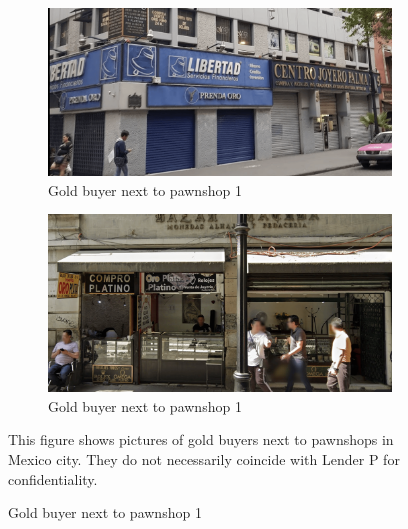 \vspace{.1in}
\begin{figure}[H]
     \caption{Gold buyers next to pawnshops}
    \label{GoldBuyers}
    \begin{center}
    \begin{subfigure}{.49\textwidth}
    \caption{Gold buyer next to pawnshop 1}
        \centering
        \includegraphics[width=\textwidth]{Figuras/empenio7_.png}
    \end{subfigure}
    \begin{subfigure}{.49\textwidth}
    \caption{Gold buyer next to pawnshop 1}
        \centering
        \includegraphics[width=\textwidth]{Figuras/empenio8_.png}
    \end{subfigure}
       \vspace{3ex}
       
    \end{center}
    \scriptsize
        This figure shows pictures of gold buyers next to pawnshops in Mexico city. They do not necessarily coincide with Lender P for confidentiality. 
\end{figure}

